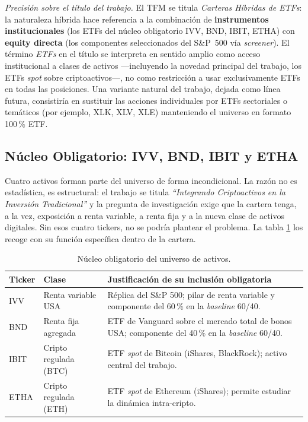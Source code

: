 \documentclass[IB,a4paper]{TFUOC}
\begin{document}
\noindent\textit{Precisión sobre el título del trabajo.} El TFM se titula \textit{Carteras Híbridas de ETFs}: la naturaleza híbrida hace referencia a la combinación de \textbf{instrumentos institucionales} (los ETFs del núcleo obligatorio IVV, BND, IBIT, ETHA) con \textbf{equity directa} (los componentes seleccionados del S\&P~500 vía \textit{screener}). El término \textit{ETFs} en el título se interpreta en sentido amplio como acceso institucional a clases de activos ---incluyendo la novedad principal del trabajo, los ETFs \textit{spot} sobre criptoactivos---, no como restricción a usar exclusivamente ETFs en todas las posiciones. Una variante natural del trabajo, dejada como línea futura, consistiría en sustituir las acciones individuales por ETFs sectoriales o temáticos (por ejemplo, XLK, XLV, XLE) manteniendo el universo en formato 100\,\% ETF.

\subsection{Núcleo Obligatorio: IVV, BND, IBIT y ETHA}
\label{sec:universo_nucleo}

Cuatro activos forman parte del universo de forma incondicional. La razón no es estadística, es estructural: el trabajo se titula \textit{``Integrando Criptoactivos en la Inversión Tradicional''} y la pregunta de investigación exige que la cartera tenga, a la vez, exposición a renta variable, a renta fija y a la nueva clase de activos digitales. Sin esos cuatro tickers, no se podría plantear el problema. La tabla \ref{tab:universo_core} los recoge con su función específica dentro de la cartera.

\begin{table}[h]
\centering
\renewcommand{\arraystretch}{1.25}
\begin{tabular}{|l|l|p{8.5cm}|}
\hline
\textbf{Ticker} & \textbf{Clase} & \textbf{Justificación de su inclusión obligatoria} \\ \hline
IVV & Renta variable USA & Réplica del S\&P 500; pilar de renta variable y componente del 60\,\% en la \textit{baseline} 60/40. \\ \hline
BND & Renta fija agregada & ETF de Vanguard sobre el mercado total de bonos USA; componente del 40\,\% en la \textit{baseline} 60/40. \\ \hline
IBIT & Cripto regulada (BTC) & ETF \textit{spot} de Bitcoin (iShares, BlackRock); activo central del trabajo. \\ \hline
ETHA & Cripto regulada (ETH) & ETF \textit{spot} de Ethereum (iShares); permite estudiar la dinámica intra-cripto. \\ \hline
\end{tabular}
\caption{Núcleo obligatorio del universo de activos.}
\label{tab:universo_core}
\end{table}
\end{document}

